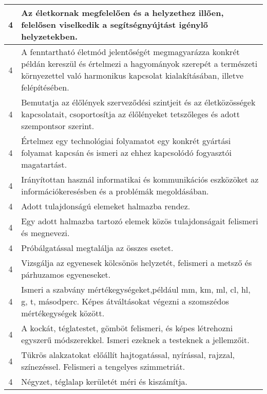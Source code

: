 \begin{longtable}{c | p{12cm} }
                                
                                          4 &  Az életkornak megfelelően és a helyzethez illően, felelősen viselkedik a segítségnyújtást igénylő helyzetekben. \\ \hline
                                          4 &  A fenntartható életmód jelentőségét megmagyarázza konkrét példán kereszül és értelmezi a hagyományok szerepét a természeti környezettel való harmonikus kapcsolat kialakításában, illetve felépítésében. \\ \hline
                                          4 &  Bemutatja az élőlények szerveződési szintjeit és az életközösségek kapcsolatait, csoportosítja az élőlényeket tetszőleges és adott szempontsor szerint. \\ \hline
                                          4 &  Értelmez egy technológiai folyamatot egy konkrét gyártási folyamat kapcsán és ismeri az ehhez kapcsolódó fogyasztói magatartást. \\ \hline
                                          4 &  Irányítottan használ informatikai és kommunikációs eszközöket az információkeresésben és a problémák megoldásában. \\ \hline
                                          4 &  Adott tulajdonságú elemeket halmazba rendez. \\ \hline
                                          4 &  Egy adott halmazba tartozó elemek közös tulajdonságait felismeri és megnevezi. \\ \hline
                                          4 &  Próbálgatással megtalálja az összes esetet. \\ \hline
                                          4 &  Vizsgálja az egyenesek kölcsönös helyzetét, felismeri a metsző és párhuzamos egyeneseket. \\ \hline
                                          4 &  Ismeri a szabvány mértékegységeket,például mm, km, ml, cl, hl, g, t, másodperc. Képes átváltásokat végezni a szomszédos mértékegységek között. \\ \hline
                                          4 &  A kockát, téglatestet, gömböt felismeri, és képes létrehozni egyszerű módszerekkel. Ismeri ezeknek a testeknek a jellemzőit. \\ \hline
                                          4 &  Tükrös alakzatokat  előállít hajtogatással, nyírással, rajzzal, színezéssel. Felismeri a tengelyes szimmetriát. \\ \hline
                                          4 &  Négyzet, téglalap kerületét méri és kiszámítja. \\ \hline

\end{longtable}
